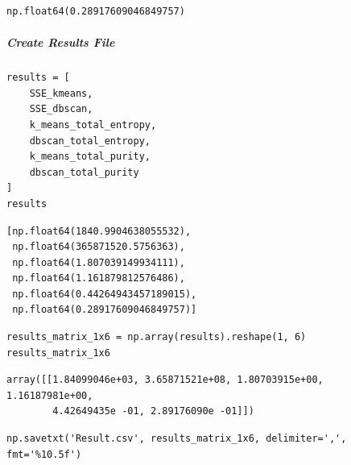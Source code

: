 \begin{verbatim}
np.float64(0.28917609046849757)
\end{verbatim}

\subparagraph{Create Results File}

\begin{verbatim}
results = [
    SSE_kmeans,
    SSE_dbscan,
    k_means_total_entropy,
    dbscan_total_entropy,
    k_means_total_purity,
    dbscan_total_purity
]
results
\end{verbatim}

\begin{verbatim}
[np.float64(1840.9904638055532),
 np.float64(365871520.5756363),
 np.float64(1.807039149934111),
 np.float64(1.161879812576486),
 np.float64(0.44264943457189015),
 np.float64(0.28917609046849757)]
\end{verbatim}

\begin{verbatim}
results_matrix_1x6 = np.array(results).reshape(1, 6)
results_matrix_1x6
\end{verbatim}

\begin{verbatim}
array([[1.84099046e+03, 3.65871521e+08, 1.80703915e+00, 1.16187981e+00,
        4.42649435e -01, 2.89176090e -01]])
\end{verbatim}

\begin{verbatim}
np.savetxt('Result.csv', results_matrix_1x6, delimiter=',', fmt='%10.5f')
\end{verbatim}